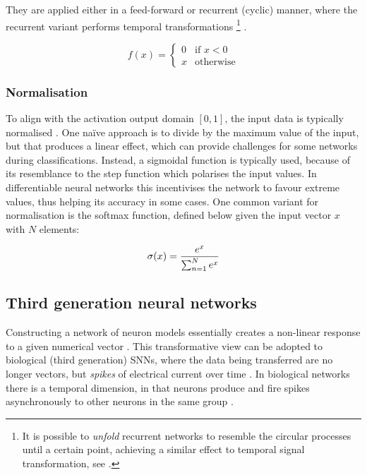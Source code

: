 \documentclass[report.tex]{subfiles}
\begin{document}
They are applied either in a feed-forward or recurrent (cyclic) manner, where
the recurrent variant performs temporal transformations
\footnote{It is possible to \textit{unfold} recurrent
networks to resemble the circular processes until a certain point, achieving
a similar effect to temporal signal transformation, see \cite{Mozer1995}.}
\cite{Schmidhuber2014}.

\begin{equation} \label{eq:ReLU}
f(x) = \begin{cases}
         0 & \text{if } x < 0 \\
	 x & \text{otherwise}
       \end{cases}
\end{equation}

\subsubsection{Normalisation}
To align with the activation output domain $[0, 1]$, the input data
is typically normalised \cite{Bishop2006}.
One naïve approach is to divide by the maximum value of the input, but
that produces a linear effect, which can provide challenges for some networks
during classifications.
Instead, a sigmoidal function is typically used, because of its resemblance to
the step function which polarises the input values. 
In differentiable neural networks this incentivises the network to favour
extreme values, thus helping its accuracy in some cases.
One common variant for normalisation is the softmax
function, defined below given the input vector $x$ with $N$ elements:

\begin{equation}
  \sigma(x) = { e^x \over \sum^N_{n=1} e^x}
  \label{eq:softmax}
\end{equation}

\subsection{Third generation neural networks}
Constructing a network of neuron models essentially creates a non-linear
response to a given numerical vector \cite{Russel2007}.
This transformative view can be adopted to biological (third generation)
\glspl{SNN}, where the data being transferred are no longer vectors, but 
\textit{spikes}
of electrical current over time \cite[p. 32]{Dayan2001, Eliasmith2004}.
In biological networks there is a temporal dimension, in that neurons
produce and fire spikes asynchronously to other neurons in the same
group \cite{Eliasmith2004}.
\end{document}

